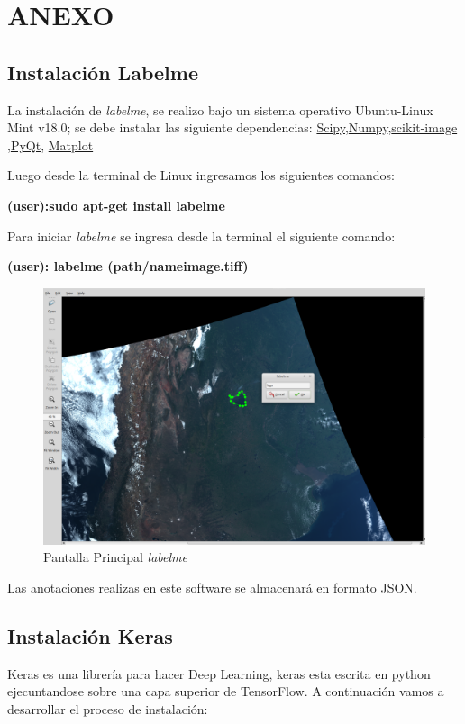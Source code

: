 \chapter{ANEXO}\label{chap:anexo}
\section{Instalación Labelme}\label{sec:instalacionlabelme}
La instalación de \textit{labelme}, se realizo bajo un sistema operativo Ubuntu-Linux Mint v18.0; se debe instalar las siguiente dependencias:
\href{https://www.scipy.org/}{Scipy},\href{http://www.numpy.org/}{Numpy},\href{http://scikit-image.org/}{scikit-image}
,\href{https://riverbankcomputing.com/software/pyqt/intro}{PyQt}, \href{http://matplotlib.org/}{Matplot}


Luego desde la terminal de Linux ingresamos los siguientes comandos:

\textbf{(user):sudo apt-get install labelme}

Para iniciar \textit{labelme} se ingresa desde la terminal el siguiente comando:

\textbf{(user): labelme (path/nameimage.tiff)}

\begin{figure}[H]
 \centering
  \includegraphics[scale=0.3,keepaspectratio=true,clip=true]{imagenes/Apendice/labelme1.png}
  \caption{Pantalla Principal \textit{labelme}}
	\label{Fig: labelme}
\end{figure}

Las anotaciones realizas en este software se almacenará en formato JSON.

\section{Instalación Keras}\label{sec:instalacionkeras}
Keras es una librería para hacer Deep Learning, keras esta escrita en python ejecuntandose sobre una capa superior de TensorFlow. A continuación vamos a desarrollar el proceso de instalación:

